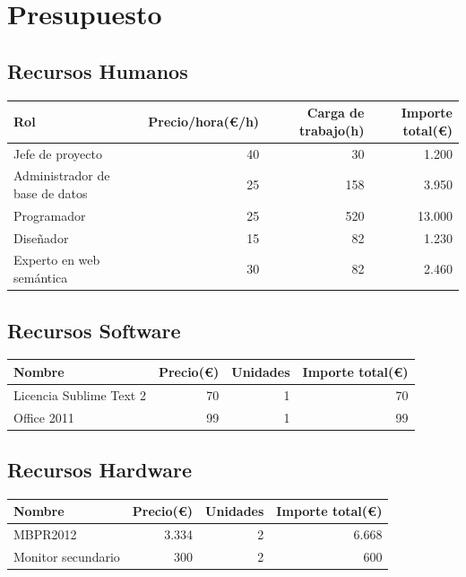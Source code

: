 \chapter{Presupuesto}

\section{Recursos Humanos}

\begin{center}
	\begin{tabular}{| l | r | r | r |}
		\hline
		Rol					&	Precio/hora(\euro/h)	&	Carga de trabajo(h)	&	Importe total(\euro)	\\	\hline
		Jefe de proyecto	& 	40						&	30 					& 	1.200					\\	\hline
		Administrador de base de datos &	25			&	158					&	3.950					\\	\hline
		Programador			&	25						&	520					&	13.000					\\	\hline
		Diseñador			&	15						&	82					&	1.230					\\	\hline
		Experto en web semántica	&		30			&	82					&	2.460					\\
		\hline
	\end{tabular}
\end{center}

\section{Recursos Software}

\begin{center}
	\begin{tabular}{| l | r | r | r |}
		\hline
		Nombre					&	Precio(\euro)	&	Unidades	&	Importe total(\euro)	\\	\hline
		Licencia Sublime Text 2	& 	70				&	1 			& 	70						\\	\hline
		Office 2011 			&	99				&	1			&	99						\\
		\hline
	\end{tabular}
\end{center}

\section{Recursos Hardware}

\begin{center}
	\begin{tabular}{| l | r | r | r |}
		\hline
		Nombre				&	Precio(\euro)	&	Unidades	&	Importe total(\euro)	\\	\hline
		MBPR2012			& 	3.334			&	2 			&	6.668					\\	\hline
		Monitor secundario	&	300				&	2			&	600						\\
		\hline
	\end{tabular}
\end{center}

